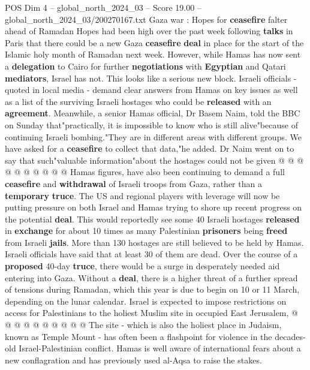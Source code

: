 \begin{textsample}{POS Dim 4 – global\_north\_2024\_03 – Score 19.00 – global\_north\_2024\_03/200270167.txt}  \label{ex:f4_pos_244}
Gaza war : Hopes for \textbf{ceasefire} falter ahead of Ramadan Hopes had been high over the past week following \textbf{talks} in Paris that there could be a new Gaza \textbf{ceasefire} \textbf{deal} in place for the start of the Islamic holy month of Ramadan next week.
However, while Hamas has now sent a \textbf{delegation} to Cairo for further \textbf{negotiations} with \textbf{Egyptian} and Qatari \textbf{mediators}, Israel has not.
This looks like a serious new block.
Israeli officials - quoted in local media - demand clear answers from Hamas on key issues as well as a list of the surviving Israeli hostages who could be \textbf{released} with an \textbf{agreement}.
Meanwhile, a senior Hamas official, Dr Basem Naim, told the BBC on Sunday that"practically, it is impossible to know who is still alive"because of continuing Israeli bombing."They are in different areas with different groups.
We have asked for a \textbf{ceasefire} to collect that data,"he added.
Dr Naim went on to say that such"valuable information"about the hostages could not be given @ @ @ @ @ @ @ @ @ @ Hamas figures, have also been continuing to demand a full \textbf{ceasefire} and \textbf{withdrawal} of Israeli troops from Gaza, rather than a \textbf{temporary} \textbf{truce}.
The US and regional players with leverage will now be putting pressure on both Israel and Hamas trying to shore up recent progress on the potential \textbf{deal}.
This would reportedly see some 40 Israeli hostages \textbf{released} in \textbf{exchange} for about 10 times as many Palestinian \textbf{prisoners} being \textbf{freed} from Israeli \textbf{jails}.
More than 130 hostages are still believed to be held by Hamas.
Israeli officials have said that at least 30 of them are dead.
Over the course of a \textbf{proposed} 40-day \textbf{truce}, there would be a surge in desperately needed aid entering into Gaza.
Without a \textbf{deal}, there is a higher threat of a further spread of tensions during Ramadan, which this year is due to begin on 10 or 11 March, depending on the lunar calendar.
Israel is expected to impose restrictions on access for Palestinians to the holiest Muslim site in occupied East Jerusalem, @ @ @ @ @ @ @ @ @ @ The site - which is also the holiest place in Judaism, known as Temple Mount - has often been a flashpoint for violence in the decades-old Israel-Palestinian conflict.
Hamas is well aware of international fears about a new conflagration and has previously used al-Aqsa to raise the stakes.

\end{textsample}
